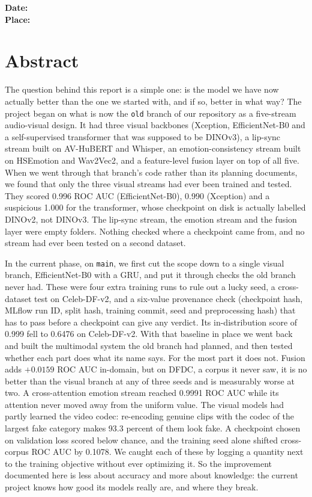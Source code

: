 \vspace{24pt}

\noindent\textbf{Date:}\\
\noindent\textbf{Place:} \PlaceCity

\clearpage

\chapter*{Abstract}

The question behind this report is a simple one: is the model we have now
actually better than the one we started with, and if so, better in what way?
The project began on what is now the \texttt{old} branch of our repository as a
five-stream audio-visual design. It had three visual backbones (Xception,
EfficientNet-B0 and a self-supervised transformer that was supposed to be
DINOv3), a lip-sync stream built on AV-HuBERT and Whisper, an
emotion-consistency stream built on HSEmotion and Wav2Vec2, and a
feature-level fusion layer on top of all five. When we went through that
branch's code rather than its planning documents, we found that only the three
visual streams had ever been trained and tested. They scored 0.996 ROC AUC
(EfficientNet-B0), 0.990 (Xception) and a suspicious 1.000 for the
transformer, whose checkpoint on disk is actually labelled DINOv2, not DINOv3.
The lip-sync stream, the emotion stream and the fusion layer were empty
folders. Nothing checked where a checkpoint came from, and no stream had ever
been tested on a second dataset.

In the current phase, on \texttt{main}, we first cut the scope down to a single
visual branch, EfficientNet-B0 with a GRU, and put it through checks the old
branch never had. These were four extra training runs to rule out a lucky
seed, a cross-dataset test on Celeb-DF-v2, and a six-value provenance check
(checkpoint hash, MLflow run ID, split hash, training commit, seed and
preprocessing hash) that has to pass before a checkpoint can give any verdict.
Its in-distribution score of 0.999 fell to 0.6476 on Celeb-DF-v2. With that
baseline in place we went back and built the multimodal system the old branch
had planned, and then tested whether each part does what its name says. For
the most part it does not. Fusion adds $+0.0159$ ROC AUC in-domain, but on
DFDC, a corpus it never saw, it is no better than the visual branch at any of
three seeds and is measurably worse at two. A cross-attention emotion stream
reached 0.9991 ROC AUC while its attention never moved away from the uniform
value. The visual models had partly learned the video codec: re-encoding
genuine clips with the codec of the largest fake category makes 93.3 percent
of them look fake. A checkpoint chosen on validation loss scored below chance,
and the training seed alone shifted cross-corpus ROC AUC by 0.1078. We caught
each of these by logging a quantity next to the training objective without
ever optimizing it. So the improvement documented here is less about accuracy
and more about knowledge: the current project knows how good its models really
are, and where they break.


